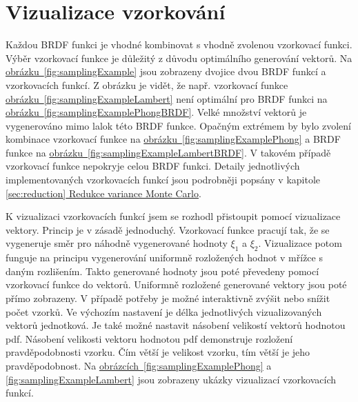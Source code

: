 \documentclass[czech,master]{diploma}
\newcommand{\randU}{\xi_{1}}
\newcommand{\randV}{\xi_{2}}
\begin{document}
\section{Vizualizace vzorkování} \label{sec:samplingViz}
Každou BRDF funkci je vhodné kombinovat s vhodně zvolenou vzorkovací funkci. Výběr vzorkovací funkce je důležitý z důvodu optimálního generování vektorů. Na \hyperref[fig:samplingExample]{obrázku~\ref{fig:samplingExample}} jsou zobrazeny dvojice dvou BRDF funkcí a vzorkovacích funkcí. Z obrázku je vidět, že např. vzorkovací funkce \hyperref[fig:samplingExampleLambert]{obrázku~\ref{fig:samplingExampleLambert}} není optimální pro  BRDF funkci na \hyperref[fig:samplingExamplePhongBRDF]{obrázku~\ref{fig:samplingExamplePhongBRDF}}. Velké množství vektorů je vygenerováno mimo lalok této BRDF funkce. Opačným extrémem by bylo zvolení kombinace vzorkovací funkce na \hyperref[fig:samplingExamplePhong]{obrázku~\ref{fig:samplingExamplePhong}} a BRDF funkce na \hyperref[fig:samplingExampleLambertBRDF]{obrázku~\ref{fig:samplingExampleLambertBRDF}}. V takovém případě vzorkovací funkce nepokryje celou BRDF funkci. Detaily jednotlivých implementovaných vzorkovacích funkcí jsou podrobněji popsány v kapitole \hyperref[sec:reduction]{\ref{sec:reduction} Redukce variance Monte Carlo}. \par
K vizualizaci vzorkovacích funkcí jsem se rozhodl přistoupit pomocí vizualizace vektory. Princip je v zásadě jednoduchý. Vzorkovací funkce pracují tak, že se vygeneruje směr pro náhodně vygenerované hodnoty \(\randU\) a \(\randV\). Vizualizace potom funguje na principu vygenerování uniformně rozložených hodnot v mřížce s daným rozlišením. Takto generované hodnoty jsou poté převedeny pomocí vzorkovací funkce do vektorů. Uniformně rozložené generované vektory jsou poté přímo zobrazeny. V případě potřeby je možné interaktivně zvýšit nebo snížit počet vzorků. Ve výchozím nastavení je délka jednotlivých vizualizovaných vektorů jednotková. Je také možné nastavit násobení velikostí vektorů hodnotou pdf. Násobení velikosti vektoru hodnotou pdf demonstruje rozložení pravděpodobnosti vzorku. Čím větší je velikost vzorku, tím větší je jeho pravděpodobnost. Na \hyperref[fig:samplingExamplePhong]{obrázcích~\ref{fig:samplingExamplePhong}} a \hyperref[fig:samplingExampleLambert]{\ref{fig:samplingExampleLambert}} jsou zobrazeny ukázky vizualizací vzorkovacích funkcí.
\end{document}

